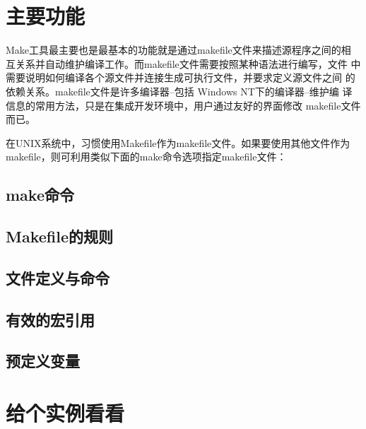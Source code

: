 \section{主要功能}

Make工具最主要也是最基本的功能就是通过makefile文件来描述源程序之间的相
互关系并自动维护编译工作。而makefile文件需要按照某种语法进行编写，文件
中需要说明如何编译各个源文件并连接生成可执行文件，并要求定义源文件之间
的依赖关系。makefile文件是许多编译器--包括 Windows NT下的编译器--维护编
译信息的常用方法，只是在集成开发环境中，用户通过友好的界面修改
makefile文件而已。

在UNIX系统中，习惯使用Makefile作为makefile文件。如果要使用其他文件作为
makefile，则可利用类似下面的make命令选项指定makefile文件：

\subsection{make命令}

\subsection{Makefile的规则}

\subsection{文件定义与命令}

\subsection{有效的宏引用}

\subsection{预定义变量}

\section{给个实例看看}
